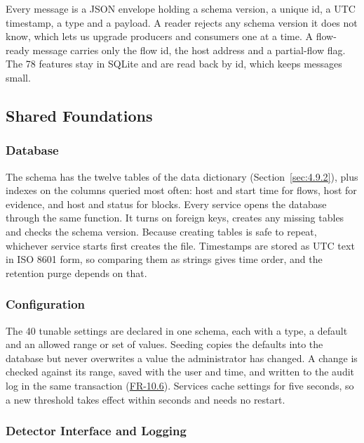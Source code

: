 \noindent Every message is a JSON envelope holding a schema version, a unique id, a UTC timestamp, a type and a payload. A reader rejects any schema version it does not know, which lets us upgrade producers and consumers one at a time. A flow-ready message carries only the flow id, the host address and a partial-flow flag. The 78 features stay in SQLite and are read back by id, which keeps messages small.

\subsection{Shared Foundations}\label{sec:7.1.4}

\subsubsection{Database}\label{sec:7.1.4.1}

\noindent The schema has the twelve tables of the data dictionary (Section~\ref{sec:4.9.2}), plus indexes on the columns queried most often: host and start time for flows, host for evidence, and host and status for blocks. Every service opens the database through the same function. It turns on foreign keys, creates any missing tables and checks the schema version. Because creating tables is safe to repeat, whichever service starts first creates the file. Timestamps are stored as UTC text in ISO 8601 form, so comparing them as strings gives time order, and the retention purge depends on that.

\subsubsection{Configuration}\label{sec:7.1.4.2}

\noindent The 40 tunable settings are declared in one schema, each with a type, a default and an allowed range or set of values. Seeding copies the defaults into the database but never overwrites a value the administrator has changed. A change is checked against its range, saved with the user and time, and written to the audit log in the same transaction (\hyperlink{req:FR-10.6}{FR-10.6}). Services cache settings for five seconds, so a new threshold takes effect within seconds and needs no restart.

\subsubsection{Detector Interface and Logging}\label{sec:7.1.4.3}

